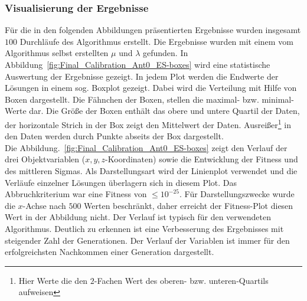 \subsubsection{Visualisierung der Ergebnisse}
Für die in den folgenden Abbildungen präsentierten Ergebnisse wurden insgesamt $100$ Durchläufe des Algorithmus erstellt. Die Ergebnisse wurden mit einem vom Algorithmus selbst erstellten $\mu$ und $\lambda$ gefunden. In Abbildung~\ref{fig:Final_Calibration_Ant0_ES-boxes} wird eine statistische Auswertung der Ergebnisse gezeigt. In jedem Plot werden die Endwerte der Lösungen in einem sog. Boxplot gezeigt. Dabei wird die Verteilung mit Hilfe von Boxen dargestellt. Die Fähnchen der Boxen, stellen die maximal- bzw. minimal-Werte dar. Die Größe der Boxen enthält das obere und untere Quartil der Daten, der horizontale Strich in der Box zeigt den Mittelwert der Daten. Ausreißer\footnote{Hier Werte die den $2$-Fachen Wert des oberen- bzw. unteren-Quartils aufweisen} in den Daten werden durch Punkte abseits der Box dargestellt.\\
%

Die Abbildung.~\ref{fig:Final_Calibration_Ant0_ES-boxes} zeigt den Verlauf der drei Objektvariablen ($x,y,z$-Koordinaten) sowie die Entwicklung der Fitness und des mittleren Sigmas. Als Darstellungsart wird der Linienplot verwendet und die Verläufe einzelner Lösungen überlagern sich in diesem Plot. Das Abbruchkriterium war eine Fitness von $\leq 10^{-25}$. Für Darstellungszwecke wurde die $x$-Achse nach $500$ Werten beschränkt, daher erreicht der Fitness-Plot diesen Wert in der Abbildung nicht. Der Verlauf ist typisch für den verwendeten Algorithmus. Deutlich zu erkennen ist eine Verbesserung des Ergebnisses mit steigender Zahl der Generationen. Der Verlauf der Variablen ist immer für den erfolgreichsten Nachkommen einer Generation dargestellt.\\
%

